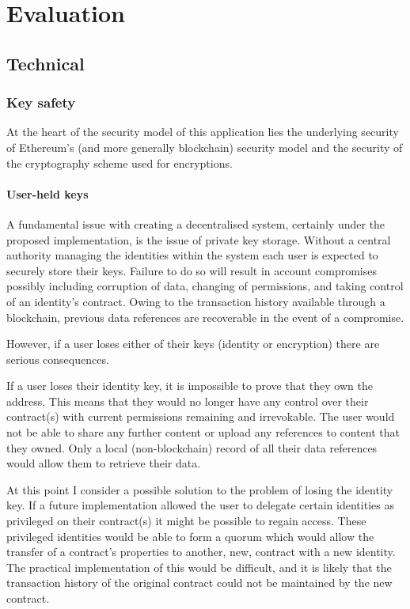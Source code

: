\section{Evaluation}

\subsection{Technical}

\subsubsection{Key safety}

At the heart of the security model of this application lies the underlying security of Ethereum's (and more generally blockchain) security model and the security of the cryptography scheme used for encryptions.

\paragraph{User-held keys}

A fundamental issue with creating a decentralised system, certainly under the proposed implementation, is the issue of private key storage. Without a central authority managing the identities within the system each user is expected to securely store their keys. Failure to do so will result in account compromises possibly including corruption of data, changing of permissions, and taking control of an identity's contract. Owing to the transaction history available through a blockchain, previous data references are recoverable in the event of a compromise.

However, if a user loses either of their keys (identity or encryption) there are serious consequences.

If a user loses their identity key, it is impossible to prove that they own the address. This means that they would no longer have any control over their contract(s) with current permissions remaining and irrevokable. The user would not be able to share any further content or upload any references to content that they owned. Only a local (non-blockchain) record of all their data references would allow them to retrieve their data.

At this point I consider a possible solution to the problem of losing the identity key. If a future implementation allowed the user to delegate certain identities as privileged on their contract(s) it might be possible to regain access. These privileged identities would be able to form a quorum which would allow the transfer of a contract's properties to another, new, contract with a new identity. The practical implementation of this would be difficult, and it is likely that the transaction history of the original contract could not be maintained by the new contract.

